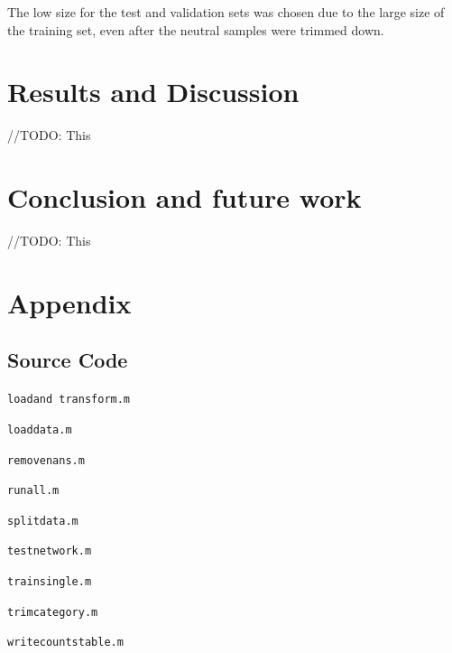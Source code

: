 \documentclass[journal]{IEEEtran}
\newcommand{\codelisting}[2]{
    \texttt{#1}
    
}
\begin{document}
The low size for the test and validation sets was chosen due to the large size of the training set,
even after the neutral samples were trimmed down.

\section{Results and Discussion}
//TODO: This

\section{Conclusion and future work}
//TODO: This


\section*{Appendix}
\subsection*{Source Code}

\codelisting{load\textunderscore and \textunderscore transform.m}{src/load_and_transform.m}
\codelisting{load\textunderscore data.m}{src/load_data.m}
\codelisting{remove\textunderscore nans.m}{src/remove_nans.m}
\codelisting{run\textunderscore all.m}{src/run_all.m}
\codelisting{split\textunderscore data.m}{src/split_data.m}
\codelisting{test\textunderscore network.m}{src/test_network.m}
\codelisting{train\textunderscore single.m}{src/train_single.m}
\codelisting{trim\textunderscore category.m}{src/trim_category.m}
\codelisting{write\textunderscore counts\textunderscore table.m}{src/write_counts_table.m}




\end{document}
